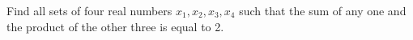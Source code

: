 \item Find all sets of four real numbers $x_1,x_2,x_3,x_4$ such that the sum of any one and the product of the other three is equal to 2.



